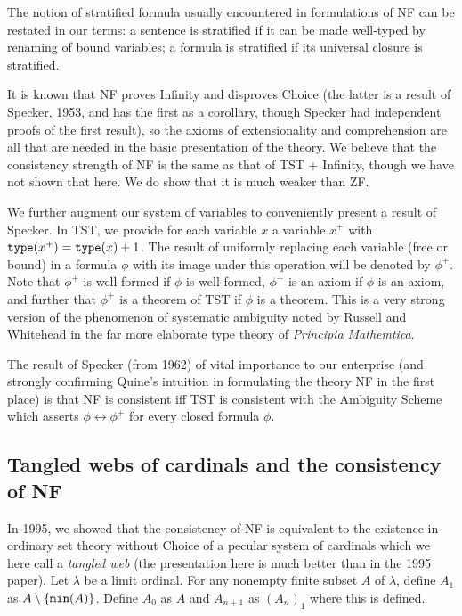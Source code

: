 \documentclass[12pt]{article}
\begin{document}
The notion of stratified formula usually encountered in formulations of NF  can be restated in our terms:  a sentence is stratified if it can be made well-typed by renaming of bound variables;  a formula is stratified if its universal closure is stratified.

It is known that NF proves Infinity and disproves Choice (the latter is a result of Specker, 1953, and has the first as a corollary, though Specker had independent proofs of the first result), so the axioms of extensionality and comprehension are all that are needed in the basic presentation of the theory.  We believe that the consistency strength of NF is the same as that of TST + Infinity, though we have not shown that here.  We do show that it is much weaker than ZF.

We further augment our system of variables to conveniently present a result of Specker.  In TST, we provide for each variable $x$ a variable $x^+$ with ${\tt type}(x^+) = {\tt type}(x)+1$.  The result of uniformly replacing each variable (free or bound) in a formula $\phi$ with its image under this operation will be denoted by $\phi^+$.  Note that $\phi^+$ is well-formed if $\phi$ is well-formed, $\phi^+$ is an axiom if $\phi$ is an axiom, and further that $\phi^+$ is a theorem of TST if $\phi$ is a theorem.  This is a very strong version of the phenomenon of systematic ambiguity noted by Russell and Whitehead in the far more elaborate type theory of {\em Principia Mathemtica\/}.

The result of Specker (from 1962) of vital importance to our enterprise (and strongly confirming Quine's intuition in formulating the theory NF in the first place) is that NF is consistent iff TST is consistent with the Ambiguity Scheme which asserts $\phi \leftrightarrow \phi^+$ for every closed formula $\phi$.

\subsection{Tangled webs of cardinals and the consistency of NF}

In 1995, we showed that the consistency of NF is equivalent to the existence in ordinary set theory without Choice  of a pecular system of cardinals which we here call a {\em tangled web\/} (the presentation here is much better than in the 1995 paper).  Let $\lambda$ be a limit ordinal.  For any nonempty finite subset $A$ of $\lambda$, define $A_1$ as $A \setminus \{{\tt min}(A)\}$.  Define $A_0$ as $A$ and $A_{n+1}$ as $(A_n)_1$ where this is defined.  
\end{document}
